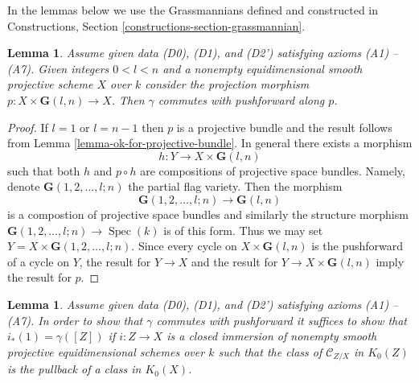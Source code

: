 \documentclass{stacks-project}
\theoremstyle{plain}
\newtheorem{lemma}[subsection]{Lemma}
\theoremstyle{definition}
\theoremstyle{remark}
\numberwithin{equation}{subsection}
\def\Spec{\mathop{\mathrm{Spec}}}
\begin{document}
\noindent
In the lemmas below we use the Grassmannians defined and constructed
in Constructions, Section \ref{constructions-section-grassmannian}.

\begin{lemma}
\label{lemma-grassmanian}
Assume given data (D0), (D1), and (D2') satisfying axioms (A1) -- (A7).
Given integers $0 < l < n$ and a nonempty equidimensional
smooth projective scheme $X$ over $k$ consider the projection morphism
$p : X \times \mathbf{G}(l, n) \to X$.
Then $\gamma$ commutes with pushforward along $p$.
\end{lemma}

\begin{proof}
If $l = 1$ or $l = n - 1$ then $p$ is a projective bundle and
the result follows from Lemma \ref{lemma-ok-for-projective-bundle}.
In general there exists a morphism
$$
h : Y \to X \times \mathbf{G}(l, n)
$$
such that both $h$ and $p \circ h$ are compositions of projective
space bundles. Namely, denote $\mathbf{G}(1, 2, \ldots, l; n)$
the partial flag variety. Then the morphism
$$
\mathbf{G}(1, 2, \ldots, l; n) \to \mathbf{G}(l, n)
$$
is a compostion of projective space bundles and similarly the
structure morphism $\mathbf{G}(1, 2, \ldots, l; n) \to \Spec(k)$
is of this form. Thus we may set $Y = X \times \mathbf{G}(1, 2, \ldots, l; n)$.
Since every cycle on $X \times \mathbf{G}(l, n)$ is the pushforward of
a cycle on $Y$, the result for $Y \to X$ and the result for
$Y \to X \times \mathbf{G}(l, n)$ imply the result for $p$.
\end{proof}

\begin{lemma}
\label{lemma-enough-better}
Assume given data (D0), (D1), and (D2') satisfying axioms (A1) -- (A7).
In order to show that $\gamma$ commutes with pushforward it suffices
to show that $i_*(1) = \gamma([Z])$ if $i : Z \to X$ is a closed
immersion of nonempty smooth projective equidimensional schemes over $k$
such that the class of $\mathcal{C}_{Z/X}$ in $K_0(Z)$ is the
pullback of a class in $K_0(X)$.
\end{lemma}
\end{document}
